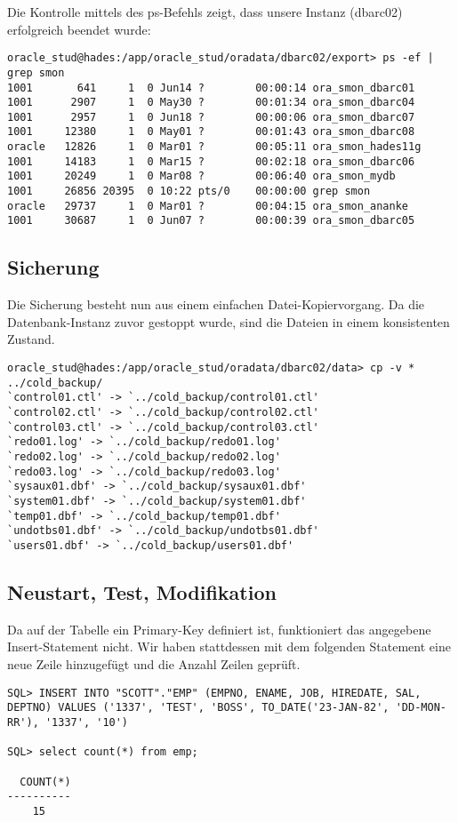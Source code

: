 \documentclass[11pt,a4paper,parskip=half]{scrartcl}
\begin{document}
Die Kontrolle mittels des ps-Befehls zeigt, dass unsere Instanz (dbarc02) erfolgreich beendet wurde:
\begin{lstlisting}
oracle_stud@hades:/app/oracle_stud/oradata/dbarc02/export> ps -ef | grep smon
1001       641     1  0 Jun14 ?        00:00:14 ora_smon_dbarc01
1001      2907     1  0 May30 ?        00:01:34 ora_smon_dbarc04
1001      2957     1  0 Jun18 ?        00:00:06 ora_smon_dbarc07
1001     12380     1  0 May01 ?        00:01:43 ora_smon_dbarc08
oracle   12826     1  0 Mar01 ?        00:05:11 ora_smon_hades11g
1001     14183     1  0 Mar15 ?        00:02:18 ora_smon_dbarc06
1001     20249     1  0 Mar08 ?        00:06:40 ora_smon_mydb
1001     26856 20395  0 10:22 pts/0    00:00:00 grep smon
oracle   29737     1  0 Mar01 ?        00:04:15 ora_smon_ananke
1001     30687     1  0 Jun07 ?        00:00:39 ora_smon_dbarc05
\end{lstlisting}

\subsection{Sicherung}
Die Sicherung besteht nun aus einem einfachen Datei-Kopiervorgang. Da die Datenbank-Instanz zuvor gestoppt wurde, sind die Dateien in einem konsistenten Zustand.

\begin{lstlisting}
oracle_stud@hades:/app/oracle_stud/oradata/dbarc02/data> cp -v * ../cold_backup/
`control01.ctl' -> `../cold_backup/control01.ctl'
`control02.ctl' -> `../cold_backup/control02.ctl'
`control03.ctl' -> `../cold_backup/control03.ctl'
`redo01.log' -> `../cold_backup/redo01.log'
`redo02.log' -> `../cold_backup/redo02.log'
`redo03.log' -> `../cold_backup/redo03.log'
`sysaux01.dbf' -> `../cold_backup/sysaux01.dbf'
`system01.dbf' -> `../cold_backup/system01.dbf'
`temp01.dbf' -> `../cold_backup/temp01.dbf'
`undotbs01.dbf' -> `../cold_backup/undotbs01.dbf'
`users01.dbf' -> `../cold_backup/users01.dbf'
\end{lstlisting}

\subsection{Neustart, Test, Modifikation}
Da auf der Tabelle ein Primary-Key definiert ist, funktioniert das angegebene Insert-Statement nicht. Wir haben stattdessen mit dem folgenden Statement eine neue Zeile hinzugefügt und die Anzahl Zeilen geprüft.
\begin{lstlisting}
SQL> INSERT INTO "SCOTT"."EMP" (EMPNO, ENAME, JOB, HIREDATE, SAL, DEPTNO) VALUES ('1337', 'TEST', 'BOSS', TO_DATE('23-JAN-82', 'DD-MON-RR'), '1337', '10')

SQL> select count(*) from emp;                   

  COUNT(*)
----------
	15
\end{lstlisting}
\end{document}
